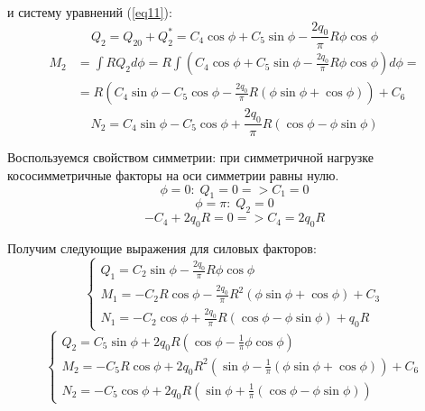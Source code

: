и систему уравнений (\ref{eq11}):
\begin{equation}
    \label{eq15}
    Q_2 = Q_{20} + Q_2^* = C_4 \cos \phi + C_5 \sin \phi - \frac{2q_0}{\pi} R\phi \cos \phi
\end{equation}
\begin{equation}
    \label{eq16}
    \begin{split}
        M_2 & = \int{RQ_2 d \phi} = R \int{(C_4 \cos \phi + C_5 \sin \phi - \frac{2q_0}{\pi}R \phi \cos \phi) d \phi} =
        \\
        & = R (C_4 \sin \phi - C_5 \cos \phi - \frac{2q_0}{\pi}R (\phi \sin \phi + \cos \phi)) + C_6
    \end{split}
\end{equation}
\begin{equation}
    \label{eq17}
    N_2 = C_4 \sin \phi - C_5 \cos \phi + \frac{2q_0}{\pi} R (\cos \phi - \phi \sin \phi)
\end{equation}

Воспользуемся свойством симметрии: при симметричной нагрузке кососимметричные факторы на оси симметрии равны нулю.
\begin{equation}
    \label{eq18}
    \phi = 0: \; Q_1 = 0 => C_1 = 0
\end{equation}
\begin{equation}
    \label{eq19}
    \phi = \pi: \; Q_2 = 0
\end{equation}
\begin{equation}
    \label{eq20}
    -C_4 + 2q_0R = 0 => C_4 = 2q_0R
\end{equation}

Получим следующие выражения для силовых факторов:
\begin{equation}
    \label{eq21}
    \begin{cases}
        \displaystyle Q_1 = C_2 \sin \phi - \frac{2q_0}{\pi}R \phi \cos \phi
        \\[10pt]
        \displaystyle M_1 = - C_2 R \cos \phi - \frac{2q_0}{\pi}R^2 (\phi \sin \phi + \cos \phi) + C_3
        \\[10pt]
        \displaystyle N_1 = - C_2 \cos \phi + \frac{2q_0}{\pi}R (\cos \phi - \phi \sin \phi) + q_0 R
    \end{cases}
\end{equation}
\begin{equation}
    \label{eq22}
    \begin{cases}
        \displaystyle Q_2 = C_5 \sin \phi + 2q_0 R (\cos \phi - \frac{1}{\pi}\phi \cos \phi)
        \\[10pt]
        \displaystyle M_2 = -C_5 R \cos \phi + 2q_0R^2 (\sin \phi - \frac{1}{\pi} (\phi \sin \phi + \cos \phi)) + C_6
        \\[10pt]
        \displaystyle N_2 = - C_5 \cos \phi + 2q_0 R (\sin \phi + \frac{1}{\pi} (\cos \phi - \phi \sin \phi))
    \end{cases}
\end{equation}

